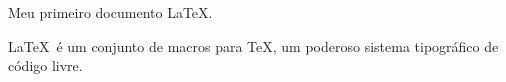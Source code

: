 \documentclass{article}
\begin{document}
Meu primeiro documento \LaTeX.

\LaTeX \ \'e um conjunto de macros para \TeX, um poderoso sistema tipogr\'afico
de c\'odigo livre.
\end{document}
